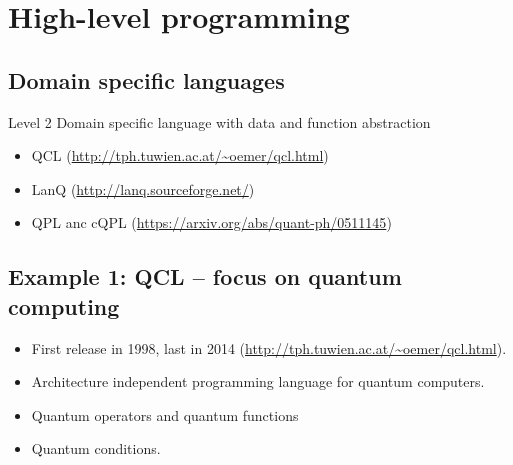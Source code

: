 \documentclass{beamer}
\begin{document}
\section{High-level programming}


\subsection{Domain specific languages}

\begin{frame}{\insertsection}{\insertsubsection}

\begin{block}{Level 2}
Domain specific language with data and function abstraction
\end{block}

\begin{itemize}
    \item QCL (\url{http://tph.tuwien.ac.at/~oemer/qcl.html})
    \item LanQ (\url{http://lanq.sourceforge.net/})
    \item QPL anc cQPL (\url{https://arxiv.org/abs/quant-ph/0511145})
\end{itemize}
\end{frame}


\subsection{Example 1: QCL -- focus on quantum computing}

\begin{frame}{\insertsection}{\insertsubsection}
	\begin{itemize}
		\item<1-> First release in 1998, last in 2014 
		(\url{http://tph.tuwien.ac.at/~oemer/qcl.html}).
		\item<2-> Architecture independent programming language for quantum 
		computers.
		\item<3-> Quantum operators and quantum functions
		\item<4-> Quantum conditions.
	\end{itemize}
	
\end{frame}
\end{document}
